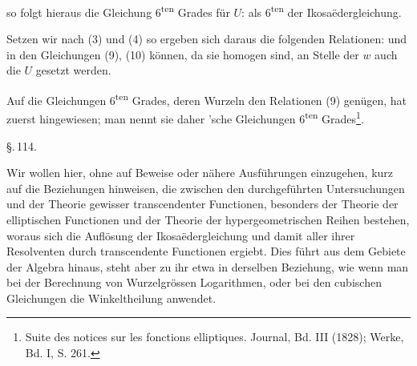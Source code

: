 so folgt hieraus die Gleichung 6\textsuperscript{ten} Grades für $U$:
als  6\textsuperscript{ten}  der Ikosaëdergleichung.

Setzen wir nach (3) und (4)
so ergeben sich daraus die folgenden Relationen:
und in den Gleichungen (9), (10) können, da sie homogen sind, an Stelle der $w$ auch die $U$ gesetzt werden.

Auf die Gleichungen 6\textsuperscript{ten} Grades, deren Wurzeln den Relationen (9) genügen, hat zuerst  hingewiesen; man nennt sie daher 'sche Gleichungen 6\textsuperscript{ten} Grades\footnote{Suite des notices sur les fonctions elliptiques.  Journal, Bd. III (1828); Werke, Bd. I, S. 261.}.

\begin{center}
\S.\,114.\\[4pt]
\end{center}

Wir wollen hier, ohne auf Beweise oder nähere Ausführungen einzugehen, kurz auf die Beziehungen hinweisen, die zwischen den durchgeführten Untersuchungen und der Theorie gewisser transcendenter Functionen, besonders der Theorie der elliptischen Functionen und der Theorie der hypergeometrischen Reihen bestehen, woraus sich die Auflösung der Ikosaëdergleichung und damit aller ihrer Resolventen durch transcendente Functionen ergiebt. Dies führt aus dem Gebiete der Algebra hinaus, steht aber zu ihr etwa in derselben Beziehung, wie wenn man bei der Berechnung von Wurzelgrössen Logarithmen, oder bei den cubischen Gleichungen die Winkeltheilung anwendet.
